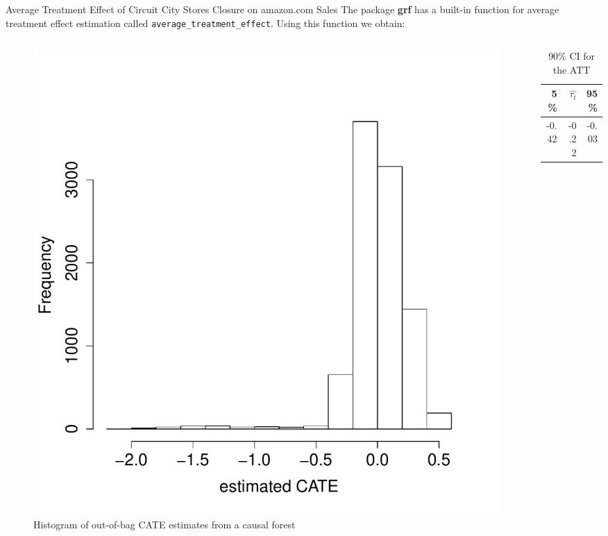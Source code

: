 \documentclass[mathserif, xcolor=table]{beamer}
\begin{document}
\begin{frame}{Average Treatment Effect of Circuit City Stores Closure on amazon.com Sales}
	The package \textbf{grf} has a built-in function for average treatment effect estimation called \texttt{average\_treatment\_effect}. Using this function we obtain:
	\vspace{-1em}
	\begin{columns}
		\begin{column}{.6\textwidth}
			\begin{figure}[h]
				\centering
				\includegraphics[scale=0.3]{pic/tauhat1_ama_hist.pdf}
				\caption{ Histogram of out-of-bag CATE estimates from a causal forest}
				\label{fig:tauhat1_ama_hist}
			\end{figure}
		\end{column}
		
		\begin{column}{.39\textwidth}
			\begin{table}[h]
				\label{}
				\caption{90\% CI for the ATT}
				\centering
				\begin{tabular}{rrr}
					\hline
					5\%  & $\hat{\tau_t}$ & 95\% \\ 
					\hline
					-0.42 & -0.22 & -0.03 \\ 
					\hline
				\end{tabular}
			\end{table}
		\end{column}
	\end{columns}
\end{frame}
\end{document}
